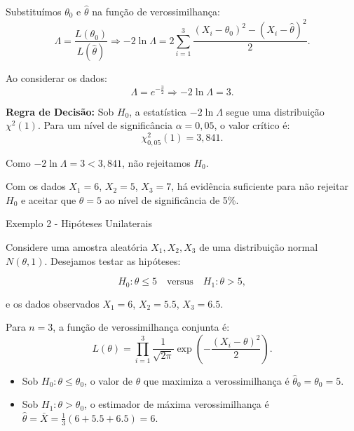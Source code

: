 \documentclass[12pt]{beamer}
\begin{document}
\begin{frame}
	\begin{block}{}
Substituímos \(\theta_0\) e \(\hat{\theta}\) na função de verossimilhança:
		\[
		\Lambda = \frac{L(\theta_0)}{L(\hat{\theta})}\Rightarrow 
		-2 \ln \Lambda = 2 \sum_{i=1}^3 \frac{(X_i - \theta_0)^2 - (X_i - \hat{\theta})^2}{2}.
		\]
		
		Ao considerar os dados:
		\[
		\Lambda=e^{-\frac{3}{2}}\Rightarrow -2 \ln \Lambda = 3.
		\]
	\end{block}
\end{frame}

\begin{frame}
	\begin{block}{}
	\justifying
		\textbf{Regra de Decisão:} Sob \(H_0\), a estatística \(-2 \ln \Lambda\) segue uma distribuição \(\chi^2(1)\). Para um nível de significância \(\alpha = 0,05\), o valor crítico é:
		\[
		\chi^2_{0,05}(1) = 3,841.
		\]
		
		Como \(-2 \ln \Lambda = 3 < 3,841\), não rejeitamos \(H_0\).

	
	Com os dados \(X_1 = 6\), \(X_2 = 5\), \(X_3 = 7\), há evidência suficiente para não rejeitar \(H_0\) e aceitar que \(\theta = 5\) ao nível de significância de 5\%.	
	\end{block}
\end{frame}

\begin{frame}{Exemplo 2 - Hipóteses Unilaterais}
	\begin{block}{}
			\justifying
	Considere uma amostra aleatória \(X_1, X_2, X_3\) de uma distribuição normal \(N(\theta, 1)\). Desejamos testar as hipóteses:
	
	\[
	H_0: \theta \leq 5 \quad \text{versus} \quad H_1: \theta > 5,
	\]
	
	e os dados observados \(X_1 = 6\), \(X_2 = 5.5\), \(X_3 = 6.5\).
			
	\end{block}
\end{frame}

\begin{frame}
	\begin{block}{}
		\justifying
		Para \(n = 3\), a função de verossimilhança conjunta é:
			\[
			L(\theta) = \prod_{i=1}^3 \frac{1}{\sqrt{2\pi}} \exp\left(-\frac{(X_i - \theta)^2}{2}\right).
			\]
			
			\begin{itemize}
				\item Sob \(H_0: \theta \leq \theta_0\), o valor de \(\theta\) que maximiza a verossimilhança é \(\hat{\theta}_0 = \theta_0 = 5\).
				\item Sob \(H_1: \theta > \theta_0\), o estimador de máxima verossimilhança é \(\hat{\theta} = \bar{X} = \frac{1}{3}(6 + 5.5 + 6.5) = 6\).
			\end{itemize}
		
	\end{block}
\end{frame}
\end{document}
